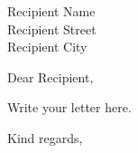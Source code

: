\documentclass[11pt]{letter}
\date{\today}
\begin{document}
\begin{letter}{Recipient Name\\Recipient Street\\Recipient City}

\opening{Dear Recipient,}

Write your letter here.

\closing{Kind regards,}

\end{letter}
\end{document}

